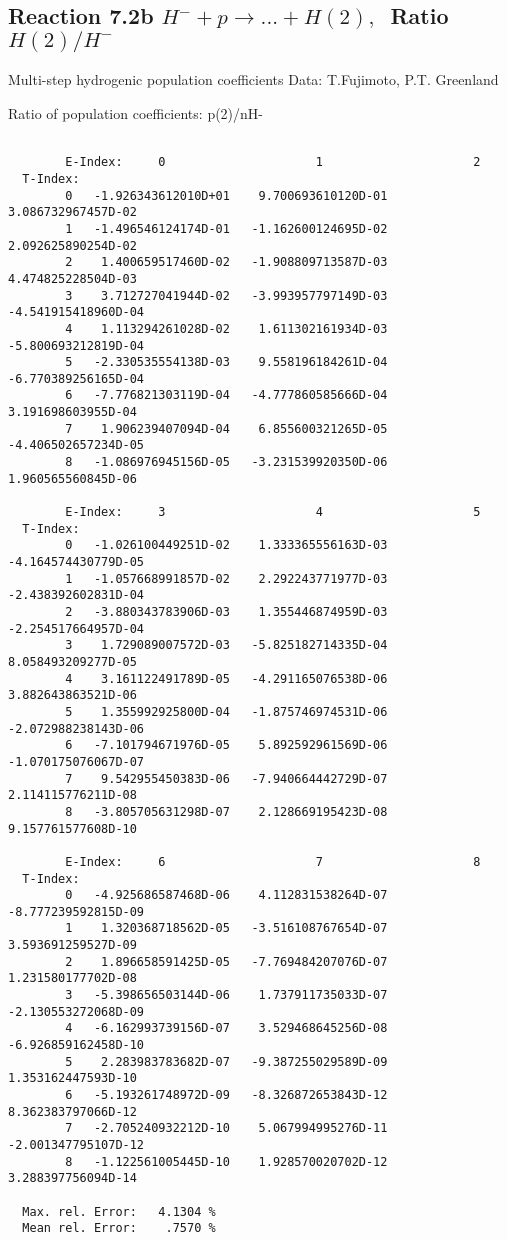 \documentclass[12pt]{article}
\begin{document}
\subsection{
Reaction 7.2b $ H^- + p \rightarrow ...+ H(2) , \  $
Ratio $H(2)/H^- $
}
 Multi-step hydrogenic population coefficients
 Data: T.Fujimoto, P.T. Greenland

 Ratio of population coefficients: p(2)/nH-

\begin{small}\begin{verbatim}

        E-Index:     0                     1                     2
  T-Index:
        0   -1.926343612010D+01    9.700693610120D-01    3.086732967457D-02
        1   -1.496546124174D-01   -1.162600124695D-02    2.092625890254D-02
        2    1.400659517460D-02   -1.908809713587D-03    4.474825228504D-03
        3    3.712727041944D-02   -3.993957797149D-03   -4.541915418960D-04
        4    1.113294261028D-02    1.611302161934D-03   -5.800693212819D-04
        5   -2.330535554138D-03    9.558196184261D-04   -6.770389256165D-04
        6   -7.776821303119D-04   -4.777860585666D-04    3.191698603955D-04
        7    1.906239407094D-04    6.855600321265D-05   -4.406502657234D-05
        8   -1.086976945156D-05   -3.231539920350D-06    1.960565560845D-06

        E-Index:     3                     4                     5
  T-Index:
        0   -1.026100449251D-02    1.333365556163D-03   -4.164574430779D-05
        1   -1.057668991857D-02    2.292243771977D-03   -2.438392602831D-04
        2   -3.880343783906D-03    1.355446874959D-03   -2.254517664957D-04
        3    1.729089007572D-03   -5.825182714335D-04    8.058493209277D-05
        4    3.161122491789D-05   -4.291165076538D-06    3.882643863521D-06
        5    1.355992925800D-04   -1.875746974531D-06   -2.072988238143D-06
        6   -7.101794671976D-05    5.892592961569D-06   -1.070175076067D-07
        7    9.542955450383D-06   -7.940664442729D-07    2.114115776211D-08
        8   -3.805705631298D-07    2.128669195423D-08    9.157761577608D-10

        E-Index:     6                     7                     8
  T-Index:
        0   -4.925686587468D-06    4.112831538264D-07   -8.777239592815D-09
        1    1.320368718562D-05   -3.516108767654D-07    3.593691259527D-09
        2    1.896658591425D-05   -7.769484207076D-07    1.231580177702D-08
        3   -5.398656503144D-06    1.737911735033D-07   -2.130553272068D-09
        4   -6.162993739156D-07    3.529468645256D-08   -6.926859162458D-10
        5    2.283983783682D-07   -9.387255029589D-09    1.353162447593D-10
        6   -5.193261748972D-09   -8.326872653843D-12    8.362383797066D-12
        7   -2.705240932212D-10    5.067994995276D-11   -2.001347795107D-12
        8   -1.122561005445D-10    1.928570020702D-12    3.288397756094D-14

  Max. rel. Error:   4.1304 %
  Mean rel. Error:    .7570 %



\end{verbatim}\end{small}
\end{document}
